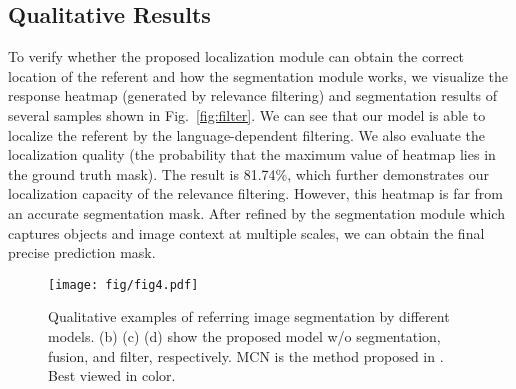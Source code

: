 \subsection{Qualitative Results}

To verify whether the proposed localization module can obtain the correct location of the referent and how the segmentation module works, we visualize the response heatmap  (generated by relevance filtering) and segmentation results of several samples shown in Fig.~\ref{fig:filter}. We can see that our model is able to localize the referent by the language-dependent filtering. 
We also evaluate the localization quality (the probability that the maximum value of heatmap lies in the ground truth mask). The result is 81.74\%, which further demonstrates our localization capacity of the relevance filtering. However, this heatmap is far from an accurate segmentation mask. After refined by the segmentation module which captures objects and image context at multiple scales, we can obtain the final precise prediction mask.

\begin{figure*}[t]
\centering
\texttt{[image: fig/fig4.pdf]}
\caption{Qualitative examples of referring image segmentation by different models. (b) (c) (d) show the proposed model w/o segmentation, fusion, and filter, respectively. MCN is the method proposed in \cite{luo2020multi}. Best viewed in color.}
\label{fig:visual}
\end{figure*}


